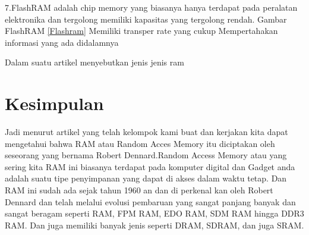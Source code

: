 7.FlashRAM adalah chip memory yang biasanya hanya terdapat pada peralatan elektronika dan tergolong memiliki kapasitas yang tergolong rendah.
Gambar FlashRAM \ref{Flashram}
    \-Memiliki transper rate yang cukup
    \-Mempertahakan informasi yang ada didalamnya

Dalam suatu artikel menyebutkan jenis \- jenis ram \cite{bruce1999unified}

\section{Kesimpulan}
Jadi menurut artikel yang telah kelompok kami buat dan kerjakan kita dapat mengetahui bahwa RAM atau Random Acces Memory itu diciptakan oleh seseorang yang bernama Robert Dennard.Random Access Memory atau yang sering kita RAM ini biasanya terdapat pada komputer digital dan Gadget anda adalah suatu tipe penyimpanan yang dapat di akses dalam waktu tetap. Dan RAM ini sudah ada sejak tahun 1960 an dan di perkenal kan oleh Robert Dennard dan telah melalui evolusi pembaruan yang sangat panjang banyak dan sangat beragam seperti RAM, FPM RAM, EDO RAM, SDM RAM hingga DDR3 RAM. Dan juga memiliki banyak jenis seperti DRAM, SDRAM, dan juga SRAM.